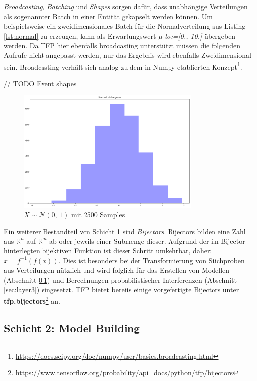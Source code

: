 \documentclass[12pt]{article}
\begin{document}
\textit{Broadcasting, Batching} und \textit{Shapes} sorgen dafür, dass unabhängige Verteilungen als sogenannter Batch in einer Entität  gekapselt werden können. Um beispielsweise ein zweidimensionales Batch für die Normalverteilung aus Listing \ref{lst:normal} zu erzeugen, kann als Erwartungswert $\mu$ \textit{loc=[0., 10.]} übergeben werden. Da TFP hier ebenfalls broadcasting unterstützt müssen die folgenden Aufrufe nicht angepasst werden, nur das Ergebnis wird ebenfalls Zweidimensional sein. Broadcasting verhält sich analog zu dem in Numpy etablierten Konzept\footnote{\url{https://docs.scipy.org/doc/numpy/user/basics.broadcasting.html}}.

// TODO Event shapes

\begin{figure}[h]
    \centering
    \includegraphics[width=0.8\textwidth]{./figs/normal-dist.png}
    \caption{$X \sim \mathcal{N}(0,\, 1)$ mit 2500 Samples}
    \label{fig:normal_dist}
\end{figure}

Ein weiterer Bestandteil von Schicht 1 sind \textit{Bijectors}. Bijectors bilden eine Zahl aus $\mathbb{R}^n$ auf $\mathbb{R}^m$ ab oder jeweils einer Submenge dieser. Aufgrund der im Bijector hinterlegten bijektiven Funktion ist dieser Schritt umkehrbar, daher: $x = f^{-1}(f(x))$. Dies ist besonders bei der Transformierung von Stichproben aus Verteilungen nützlich und wird folglich für das Erstellen von Modellen (Abschnitt \ref{sec:layer2}) und Berechnungen probabilistischer Interferenzen (Abschnitt \ref{sec:layer3}) eingesetzt. TFP bietet bereits einige vorgefertigte Bijectors unter \textbf{tfp.bijectors}\footnote{\url{https://www.tensorflow.org/probability/api_docs/python/tfp/bijectors}} an. 


\subsection{Schicht 2: Model Building}
\label{sec:layer2}
\end{document}
